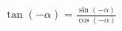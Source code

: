 \documentclass[preview]{standalone}
\begin{document}
\begin{align*}
\tan(-\alpha) = \frac{\sin(-\alpha)}{\cos(-\alpha)}
\end{align*}
\end{document}
